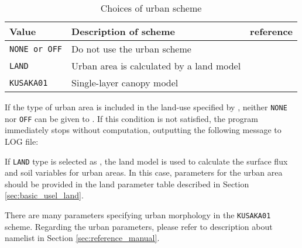 \begin{table}[hbt]
\begin{center}
  \caption{Choices of urban scheme}
  \label{tab:nml_urban}
  \begin{tabularx}{150mm}{llX} \hline
    \rowcolor[gray]{0.9}  Value  & Description of scheme & reference \\ \hline
      \verb|NONE or OFF|         & Do not use the urban scheme            \\
      \verb|LAND|                & Urban area is calculated by a land model \\
      \verb|KUSAKA01|            & Single-layer canopy model  & \citet{kusaka_2001} \\
    \hline
  \end{tabularx}
\end{center}
\end{table}

If the type of urban area is included in the land-use specified by , neither \verb|NONE| nor \verb|OFF| can be given to .
If this condition is not satisfied, the program immediately stops without computation, outputting the following message to LOG file:
%

If \verb|LAND| type is selected as , the land model is used to calculate the surface flux and soil variables for urban areas.
In this case, parameters for the urban area should be provided in the land parameter table described in Section \ref{sec:basic_usel_land}.

There are many parameters specifying urban morphology in the \verb|KUSAKA01| scheme.
Regarding the urban parameters, please refer to description about namelist in Section \ref{sec:reference_manual}.

